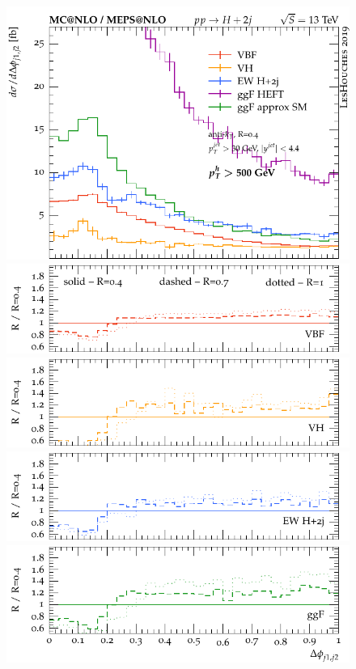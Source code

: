 \documentclass[10pt,prd,fleqn,superscriptaddress,notitlepage,nofootinbib,preprintnumbers,nobalancelastpage]{revtex4-1}
\begin{document}
\begin{figure}[p]
\begin{minipage}{.28\textwidth}
  \end{minipage}\hfill
  \begin{minipage}{.28\textwidth}
    \includegraphics[width=\textwidth]{figures/channels/delta_phi_jj12_pth500.pdf}
    \includegraphics[width=\textwidth]{figures/channels/delta_phi_jj12_pth500_rVBF.pdf}
    \includegraphics[width=\textwidth]{figures/channels/delta_phi_jj12_pth500_rVH.pdf}
    \includegraphics[width=\textwidth]{figures/channels/delta_phi_jj12_pth500_rHJJ.pdf}
    \includegraphics[width=\textwidth]{figures/channels/delta_phi_jj12_pth500_rGGH.pdf}

\end{minipage}
\end{figure}
\end{document}
